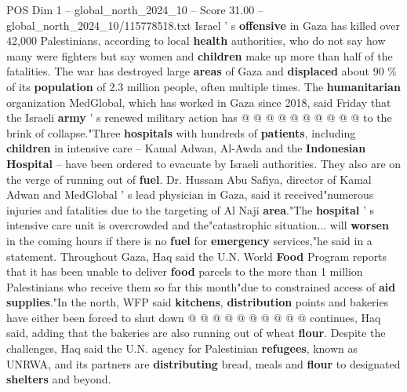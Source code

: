 \begin{textsample}{POS Dim 1 – global\_north\_2024\_10 – Score 31.00 – global\_north\_2024\_10/115778518.txt}
Israel ' s \textbf{offensive} in Gaza has killed over 42,000 Palestinians, according to local \textbf{health} authorities, who do not say how many were fighters but say women and \textbf{children} make up more than half of the fatalities.
The war has destroyed large \textbf{areas} of Gaza and \textbf{displaced} about 90 \% of its \textbf{population} of 2.3 million people, often multiple times.
The \textbf{humanitarian} organization MedGlobal, which has worked in Gaza since 2018, said Friday that the Israeli \textbf{army} ' s renewed military action has @ @ @ @ @ @ @ @ @ @ to the brink of collapse."Three \textbf{hospitals} with hundreds of \textbf{patients}, including \textbf{children} in intensive care -- Kamal Adwan, Al-Awda and the \textbf{Indonesian} \textbf{Hospital} -- have been ordered to evacuate by Israeli authorities.
They also are on the verge of running out of \textbf{fuel}.
Dr.
Hussam Abu Safiya, director of Kamal Adwan and MedGlobal ' s lead physician in Gaza, said it received"numerous injuries and fatalities due to the targeting of Al Naji \textbf{area}."The \textbf{hospital} ' s intensive care unit is overcrowded and the"catastrophic situation... will \textbf{worsen} in the coming hours if there is no \textbf{fuel} for \textbf{emergency} services,"he said in a statement.
Throughout Gaza, Haq said the U.N.
World \textbf{Food} Program reports that it has been unable to deliver \textbf{food} parcels to the more than 1 million Palestinians who receive them so far this month"due to constrained access of \textbf{aid} \textbf{supplies}."In the north, WFP said \textbf{kitchens}, \textbf{distribution} points and bakeries have either been forced to shut down @ @ @ @ @ @ @ @ @ @ continues, Haq said, adding that the bakeries are also running out of wheat \textbf{flour}.
Despite the challenges, Haq said the U.N. agency for Palestinian \textbf{refugees}, known as UNRWA, and its partners are \textbf{distributing} bread, meals and \textbf{flour} to designated \textbf{shelters} and beyond.

\end{textsample}
